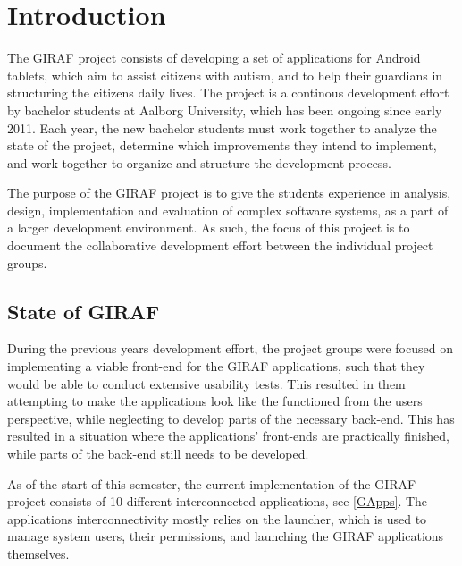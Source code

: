 \chapter{Introduction}
The GIRAF project consists of developing a set of applications for Android
tablets, which aim to assist citizens with autism, and to help their guardians in 
structuring the citizens daily lives. The project is a continous development
effort by bachelor students at Aalborg University, which has been
ongoing since early 2011. Each year, the new bachelor students must work
together to analyze the state of the project, determine which improvements
they intend to implement, and work together to organize and structure the
development process.\nl

The purpose of the GIRAF project is to give the students experience in analysis,
design, implementation and evaluation of complex software systems, as a part of
a larger development environment. As such, the focus of this project is to
document the collaborative development effort between the individual project
groups.


\section{State of GIRAF}
During the previous years development effort, the project groups were focused
on implementing a viable front-end for the GIRAF applications, such that they
would be able to conduct extensive usability tests. This resulted in them
attempting to make the applications look like the functioned from the users
perspective, while neglecting to develop parts of the necessary back-end.
This has resulted in a situation where the applications' front-ends are
practically finished, while parts of the back-end still needs to be
developed.\nl

As of the start of this semester, the current implementation of the GIRAF
project consists of 10 different interconnected applications, see
\autoref{GApps}. The applications interconnectivity mostly relies on the
launcher, which is used to manage system users, their permissions, and
launching the GIRAF applications themselves.

